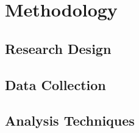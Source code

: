 \chapter{Methodology}
\section{Research Design}
\lipsum[9]

\section{Data Collection}
\lipsum[10]

\section{Analysis Techniques}
\lipsum[11]
